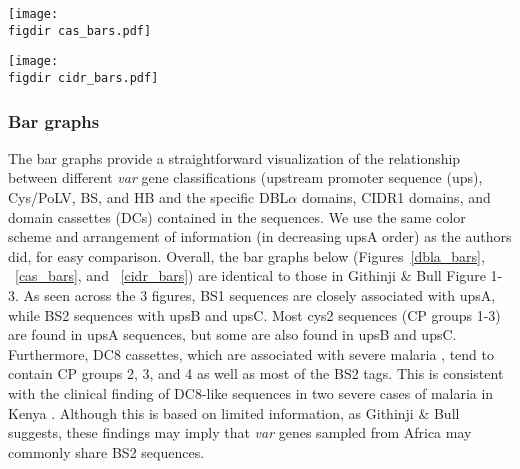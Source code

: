 \documentclass[10pt,twocolumn,superscriptaddress]{revtex4-1}
\newcommand{\var}{{\it var}\xspace}
\newcommand{\dbla}{{DBL$\alpha$}\xspace}
\newcommand{\cp}{{Cys/PoLV}\xspace}
\newcommand{\paper}{{Githinji \& Bull}\xspace}
\newcommand{\figdir}{figures/}
\begin{document}
\begin{figure*}[t]
	\centering
	\texttt{[image: \\figdir cas\_bars.pdf]}
	\caption{{\bf Correspondence between \var sequence classifications and presence of specific domain cassettes (DCs). \var sequences are classified based on DCs (horizontal axis) they contain}. The proportion of the genes carrying other sequence features (ups, \cp, block-sharing groups, select homology blocks) is shown on the vertical axis. Like in \paper, the DCs are, from left to right, in order of decreasing upsA sequences. }
	\label{cas_bars}
\end{figure*}

\begin{figure*}[t]
	\centering
	\texttt{[image: \\figdir cidr\_bars.pdf]}
	\caption{{\bf Correspondence between \var sequence classifications and presence of specific CIDR1 domains. \var sequences are classified based on CIDR1 domains (horizontal axis) they contain}. The proportion of the genes carrying other sequence features (ups, \cp, block- sharing groups, select homology blocks) is shown on the vertical axis. Like in \paper, the CIDR1 domains are, from left to right, in order of decreasing upsA sequences. }
	\label{cidr_bars}
\end{figure*}



\subsubsection{Bar graphs}
The bar graphs provide a straightforward visualization of the relationship between different \var gene classifications (upstream promoter sequence (ups), \cp, BS, and HB and the specific \dbla domains, CIDR1 domains, and domain cassettes (DCs) contained in the sequences. We use the same color scheme and arrangement of information (in decreasing upsA order) as the authors did, for easy comparison. Overall, the bar graphs below (Figures~\ref{dbla_bars}, ~\ref{cas_bars}, and ~\ref{cidr_bars}) are identical to those in \paper Figure 1-3. As seen across the 3 figures, BS1 sequences are closely associated with upsA, while BS2 sequences with upsB and upsC. Most cys2 sequences (CP groups 1-3) are found in upsA sequences, but some are also found in upsB and upsC. Furthermore, DC8 cassettes, which are associated with severe malaria \cite{lavstsen2012, rask2010}, tend to contain CP groups 2, 3, and 4 as well as most of the BS2 tags. This is consistent with the clinical finding of DC8-like sequences in two severe cases of malaria in Kenya \cite{bull2005}. Although this is based on limited information, as \paper suggests, these findings may imply that \var genes sampled from Africa may commonly share BS2 sequences. 
\end{document}
